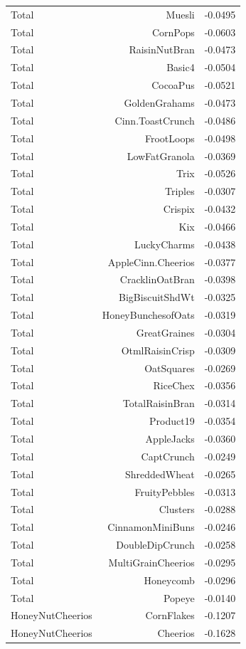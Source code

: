 \begin{longtable}{@{}lrr@{}}
Total & Muesli & -0.0495 \\
Total & CornPops & -0.0603 \\
Total & RaisinNutBran & -0.0473 \\
Total & Basic4 & -0.0504 \\
Total & CocoaPus & -0.0521 \\
Total & GoldenGrahams & -0.0473 \\
Total & Cinn.ToastCrunch & -0.0486 \\
Total & FrootLoops & -0.0498 \\
Total & LowFatGranola & -0.0369 \\
Total & Trix & -0.0526 \\
Total & Triples & -0.0307 \\
Total & Crispix & -0.0432 \\
Total & Kix & -0.0466 \\
Total & LuckyCharms & -0.0438 \\
Total & AppleCinn.Cheerios & -0.0377 \\
Total & CracklinOatBran & -0.0398 \\
Total & BigBiscuitShdWt & -0.0325 \\
Total & HoneyBunchesofOats & -0.0319 \\
Total & GreatGraines & -0.0304 \\
Total & OtmlRaisinCrisp & -0.0309 \\
Total & OatSquares & -0.0269 \\
Total & RiceChex & -0.0356 \\
Total & TotalRaisinBran & -0.0314 \\
Total & Product19 & -0.0354 \\
Total & AppleJacks & -0.0360 \\
Total & CaptCrunch & -0.0249 \\
Total & ShreddedWheat & -0.0265 \\
Total & FruityPebbles & -0.0313 \\
Total & Clusters & -0.0288 \\
Total & CinnamonMiniBuns & -0.0246 \\
Total & DoubleDipCrunch & -0.0258 \\
Total & MultiGrainCheerios & -0.0295 \\
Total & Honeycomb & -0.0296 \\
Total & Popeye & -0.0140 \\
HoneyNutCheerios & CornFlakes & -0.1207 \\
HoneyNutCheerios & Cheerios & -0.1628 \\

\end{longtable}
